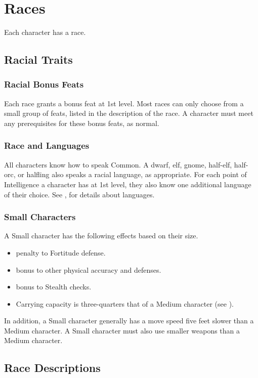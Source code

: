 \chapter{Races}\label{Races}

Each character has a race.

\section{Racial Traits}

\subsection{Racial Bonus Feats}
Each race grants a bonus feat at 1st level. Most races can only choose from a small group of feats, listed in the description of the race. A character must meet any prerequisites for these bonus feats, as normal.

\subsection{Race and Languages}
All characters know how to speak Common. A dwarf, elf, gnome, half-elf, half-orc, or halfling also speaks a racial language, as appropriate. For each point of Intelligence a character has at 1st level, they also know one additional language of their choice. See , for details about languages.

\subsection{Small Characters}\label{Small Characters}
A Small character has the following effects based on their size.
  \begin{itemize}
    \item {} penalty to Fortitude defense.
    \item {} bonus to other physical accuracy and defenses.
    \item {} bonus to Stealth checks.
    \item Carrying capacity is three-quarters that of a Medium character (see ).
  \end{itemize}

In addition, a Small character generally has a move speed five feet slower than a Medium character. A Small character must also use smaller weapons than a Medium character.

\section{Race Descriptions}

